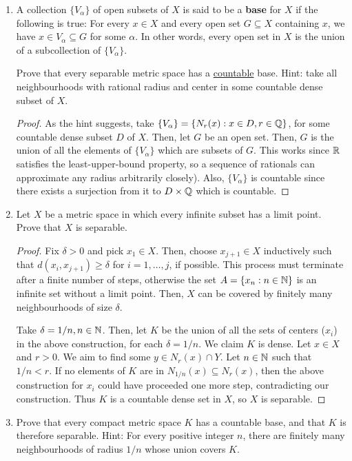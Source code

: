 \begin{enumerate}
\item %
A collection $\{V_\alpha\}$ of open subsets of $X$ is said to be a \textbf{base} for $X$ if the following is true: For every $x \in X$ and every open set $G \subseteq X$ containing $x$, we have $x \in V_\alpha \subseteq G$ for some $\alpha$. In other words, every open set in $X$ is the union of a subcollection of $\{V_\alpha\}$.

Prove that every separable metric space has a \underline{countable} base. Hint: take all neighbourhoods with rational radius and center in some countable dense subset of $X$.

\begin{proof}
As the hint suggests, take $\{V_\alpha\} = \{N_r(x): x \in D, r \in \mathbb{Q}\}$, for some countable dense subset $D$ of $X$. Then, let $G$ be an open set. Then, $G$ is the union of all the elements of $\{V_\alpha\}$ which are subsets of $G$. This works since $\mathbb{R}$ satisfies the least-upper-bound property, so a sequence of rationals can approximate any radius arbitrarily closely). Also, $\{V_\alpha\}$ is countable since there exists a surjection from it to $D \times \mathbb{Q}$ which is countable.
\end{proof}

\item %
Let $X$ be a metric space in which every infinite subset has a limit point. Prove that $X$ is separable.

\begin{proof}
Fix $\delta > 0$ and pick $x_1 \in X$. Then, choose $x_{j+1} \in X$ inductively such that $d(x_i, x_{j+1}) \ge \delta$ for $i = 1, \dotsc, j$, if possible. This process must terminate after a finite number of steps, otherwise the set $A = \{x_n : n \in \mathbb{N}\}$ is an infinite set without a limit point. Then, $X$ can be covered by finitely many neighbourhoods of size $\delta$. 

Take $\delta = 1/n, n \in \mathbb{N}$. Then, let $K$ be the union of all the sets of centers ($x_i$) in the above construction, for each $\delta = 1/n$. We claim $K$ is dense. Let $x \in X$ and $r > 0$. We aim to find some $y \in N_r(x) \cap Y$. Let $n \in \mathbb{N}$ such that $1/n < r$. If no elements of $K$ are in $N_{1/n}(x) \subseteq N_r(x)$, then the above construction for $x_i$ could have proceeded one more step, contradicting our construction. Thus $K$ is a countable dense set in $X$, so $X$ is separable.
\end{proof}

\item %
Prove that every compact metric space $K$ has a countable base, and that $K$ is therefore separable. Hint: For every positive integer $n$, there are finitely many neighbourhoods of radius $1/n$ whose union covers $K$.


\end{enumerate}
